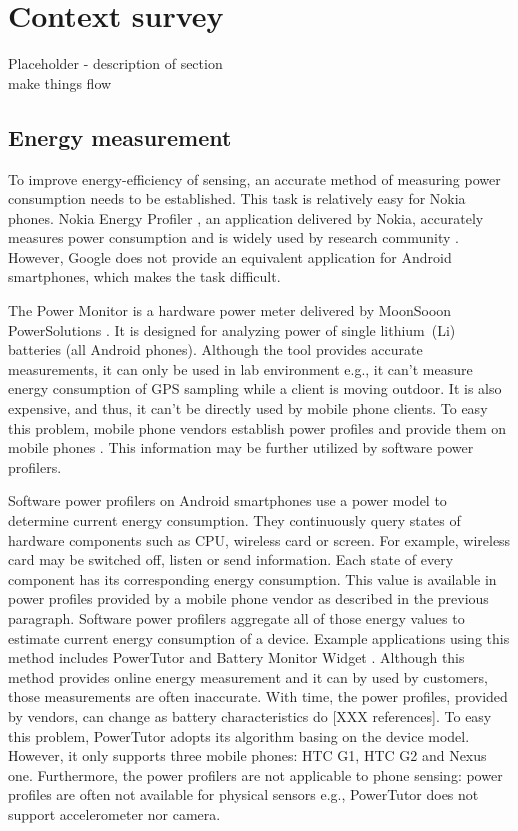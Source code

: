 \section{Context survey}
\label{s:contextsurvey}
Placeholder - description of section\\ make things flow
\subsection{Energy measurement}
\hspace{10pt} To improve energy-efficiency of sensing, an accurate method of measuring power consumption needs to be established. This task is relatively easy for Nokia phones. Nokia Energy Profiler \cite{nokia:profiler}, an application delivered by Nokia,  accurately measures power consumption and is widely used by research community \cite{kjaergaard:entracked} \cite{lu:jigsaw} \cite{li:status}. However, Google does not provide an equivalent application for Android smartphones, which makes the task difficult.

The Power Monitor is a hardware power meter delivered by MoonSooon PowerSolutions \cite{monsoon:powermonitor}.  It is designed for analyzing power of single lithium\ (Li) batteries (all Android phones). Although the tool provides accurate measurements, it can only be used in lab environment e.g., it can't measure energy consumption of GPS sampling while a client is moving outdoor. It is also expensive, and thus, it can't be directly used by mobile phone clients. To easy this problem, mobile phone vendors establish power profiles and provide them on mobile phones \cite{android:powerprofiles}. This information may be further utilized by software power profilers.

Software power profilers on Android smartphones use a power model to determine current energy consumption. They continuously query states of hardware components such as CPU, wireless card or screen. For example, wireless card may be switched off, listen or send information. Each state of every component has its corresponding energy consumption. This value is available in power profiles provided by a mobile phone vendor as described in the previous paragraph. Software power profilers aggregate all of those energy values to estimate current energy consumption of a device. Example applications using this method includes PowerTutor \cite{zhang:powertutor} and Battery Monitor Widget \cite{googleplay:batterymonitorwidget}. Although this method provides online energy measurement and it can by used by customers, those measurements are often inaccurate. With time, the power profiles, provided by vendors, can change as battery characteristics do [XXX references]. To easy this problem, PowerTutor adopts its algorithm basing on the device model. However, it only supports three mobile phones: HTC G1, HTC G2 and Nexus one. Furthermore, the power profilers are not applicable to phone sensing: power profiles are often not available for physical sensors e.g., PowerTutor does not support accelerometer nor camera.

